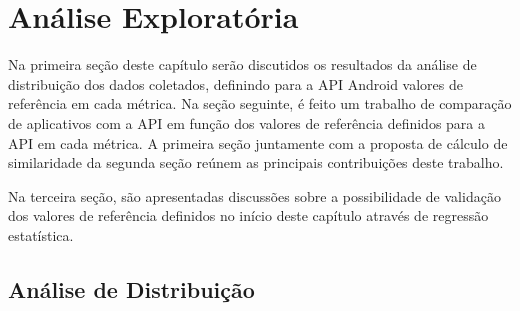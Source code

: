 \chapter{Análise Exploratória}
\label{cap:analise_exploratoria}

Na primeira seção deste capítulo serão discutidos os resultados da análise de distribuição dos dados coletados, definindo para a API Android valores de referência em cada métrica. Na seção seguinte, é feito um trabalho de comparação de aplicativos com a API em função dos valores de referência definidos para a API em cada métrica. A primeira seção juntamente com a proposta de cálculo de similaridade da segunda seção reúnem as principais contribuições deste trabalho.

Na terceira seção, são apresentadas discussões sobre a possibilidade de validação dos valores de referência definidos no início deste capítulo através de regressão estatística.

\section{Análise de Distribuição}

